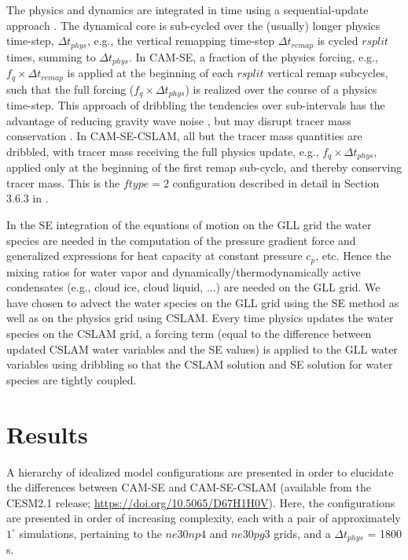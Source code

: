 \documentclass[twocol]{ametsoc}
\begin{document}
{\color{red}The physics and dynamics are integrated in time using a sequential-update approach \citep[e.g.,][]{W2002MWR}. The dynamical core is sub-cycled over the (usually) longer physics time-step, $\Delta t_{phys}$, e.g., the vertical remapping time-step $\Delta t_{remap}$ is cycled $rsplit$ times, summing to $\Delta t_{phys}$. In CAM-SE, a fraction of the physics forcing, e.g., $f_q \times \Delta t_{remap}$ is applied at the beginning of each $rsplit$ vertical remap subcycles, such that the full forcing ($f_q \times \Delta t_{phys}$) is realized over the course of a physics time-step. This approach of dribbling the tendencies over sub-intervals has the advantage of reducing gravity wave noise \citep{TJ2016GMD}, but may disrupt tracer mass conservation \citep{water-leak}. In CAM-SE-CSLAM, all but the tracer mass quantities are dribbled, with tracer mass receiving the full physics update, e.g., $f_q \times \Delta t_{phys}$, applied only at the beginning of the first remap sub-cycle, and thereby conserving tracer mass. This is the $ftype=2$ configuration described in detail in Section 3.6.3 in \cite{LetAl2018JAMES}.

In the SE integration of the equations of motion on the GLL grid the water species are needed in the computation of the pressure gradient force and generalized expressions for heat capacity at constant pressure $c_p$, etc. Hence the mixing ratios for water vapor and dynamically/thermodynamically active condensates (e.g., cloud ice, cloud liquid, ...) are needed on the GLL grid. We have chosen to advect the water species on the GLL grid using the SE method as well as on the physics grid using CSLAM. Every time physics updates the water species on the CSLAM grid, a forcing term (equal to the difference between updated CSLAM water variables and the SE values) is applied to the GLL water variables using dribbling so that the CSLAM solution and SE solution for water species are tightly coupled. 
}

\section{Results}\label{sec:results}

{\color{red}A hierarchy of idealized model configurations are presented in order to elucidate the differences between CAM-SE and CAM-SE-CSLAM (available from the CESM2.1 release; \url{https://doi.org/10.5065/D67H1H0V}). Here, the configurations are presented in order of increasing complexity, each with a pair of approximately $1^{\circ}$ simulations, pertaining to the $ne30np4$ and $ne30pg3$ grids, and a $\Delta t_{phys}$ = 1800 s.{}}
\end{document}
